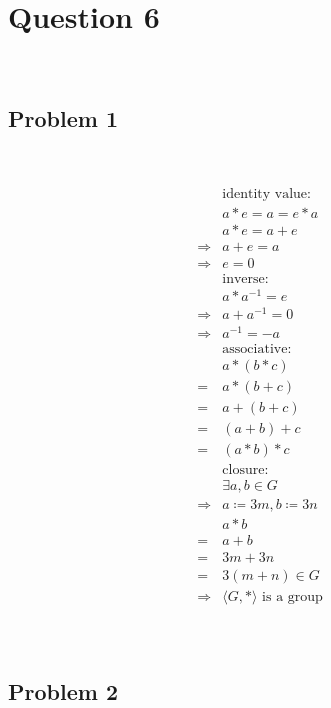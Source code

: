 \documentclass{article}
\begin{document}
\newpage

\section*{Question 6}

~

\subsection*{Problem 1}

~

\begin{equation*}
    \begin{split}
        &\text{identity value}:\\
        &a*e=a=e*a\\
        &a*e=a+e\\
        \Rightarrow&a+e=a\\
        \Rightarrow&e=0\\
        &\text{inverse}:\\
        &a*a^{-1}=e\\
        \Rightarrow&a+a^{-1}=0\\
        \Rightarrow&a^{-1}=-a\\
        &\text{associative}:\\
        &a*(b*c)\\
        =&a*(b+c)\\
        =&a+(b+c)\\
        =&(a+b)+c\\
        =&(a*b)*c\\
        &\text{closure}:\\
        &\exists a,b\in G\\
        \Rightarrow&a\coloneqq 3m, b\coloneqq 3n\\
        &a*b\\
        =&a+b\\
        =&3m+3n\\
        =&3(m+n)\in G\\
        \Rightarrow&\langle G,*\rangle\text{ is a group}\\
    \end{split}
\end{equation*}

~

\subsection*{Problem 2}
\end{document}
